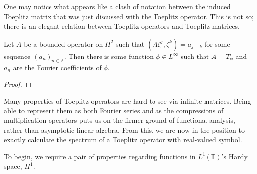 \documentclass[../main.tex]{subfiles}
\begin{document}
One may notice what appears like a clash of notation between the induced
Toeplitz matrix that was just discussed with the Toeplitz operator. This is not
so; there is an elegant relation between Toeplitz operators and Toeplitz
matrices.

\begin{theorem}
Let $A$ be a bounded operator on $H^2$ such that $(A \zeta^j, \zeta^k) =
a_{j-k}$ for some sequence $(a_n)_{n \in \mathbb{Z}}$. Then there is
some function $\phi \in L^\infty$ such that $A = T_\phi$ and $a_n$ are
the Fourier coefficients of $\phi$.
\end{theorem}
\begin{proof}
\end{proof}

Many properties of Toeplitz operators are hard to see via infinite matrices.
Being able to represent them as both Fourier series and as the  compressions of
multiplication operators puts us on the firmer ground of functional analysis,
rather than asymptotic linear algebra. From this, we
are now in the position to exactly calculate the spectrum of a Toeplitz operator
with real-valued symbol.

To begin, we require a pair of properties regarding functions in
$L^1(\mathbb{T})$'s Hardy space, $H^1$. 
\end{document}
